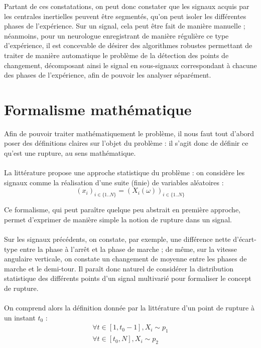 \documentclass[french,12pt,notitlepage]{report}
\begin{document}
	\vspace{1pc}
	
	Partant de ces constatations, on peut donc constater que les signaux acquis par les centrales inertielles peuvent être segmentés, qu'on peut isoler les différentes phases de l'expérience. Sur un signal, cela peut être fait de manière manuelle ; néanmoins, pour un neurologue enregistrant de manière régulière ce type d'expérience, il est concevable de désirer des algorithmes robustes permettant de traiter de manière automatique le problème de la détection des points de changement, décomposant ainsi le signal en sous-signaux correspondant à chacune des phases de l'expérience, afin de pouvoir les analyser séparément.
	
	\section{Formalisme mathématique}
	Afin de pouvoir traiter mathématiquement le problème, il nous faut tout d'abord poser des définitions claires sur l'objet du problème : il s'agit donc de définir ce qu'est une rupture, au sens mathématique.
	\\ \\
	La littérature propose une approche statistique du problème : on considère les signaux comme la réalisation d'une suite (finie) de variables aléatoires :
	\begin{equation}
		(x_i)_{i \in \{1..N\}} = (X_i(\omega))_{i \in \{1..N\}}
		\label{11}
	\end{equation}
	
	Ce formalisme, qui peut paraître quelque peu abstrait en première approche, permet d'exprimer de manière simple la notion de rupture dans un signal.
	\\ \\
	Sur les signaux précédents, on constate, par exemple, une différence nette d'écart-type entre la phase à l'arrêt et la phase de marche ; de même, sur la vitesse angulaire verticale, on constate un changement de moyenne entre les phases de marche et le demi-tour. Il paraît donc naturel de considérer la distribution statistique des différents points d'un signal multivarié pour formaliser le concept de rupture.
	\\ \\
	On comprend alors la définition donnée par la littérature d'un point de rupture à un instant $t_0$ :
	\begin{equation}
	\begin{array}{ll}
			\forall t \in [1, t_0-1], X_i \sim p_1 \\
			 \forall t \in [t_0, N], X_i \sim p_2 \\
	\end{array}
	\end{equation}
	
\end{document}
